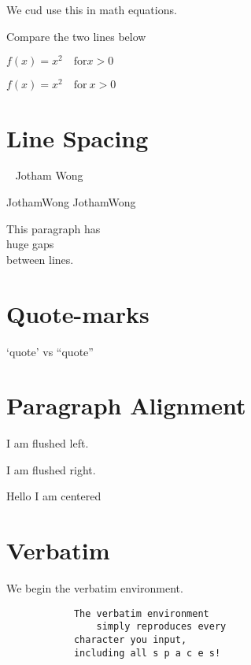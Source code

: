\documentclass[12pt]{article}
\begin{document}
    We cud use this in math equations.

    Compare the two lines below
    
    
    $f(x) = x^2 \quad \text{for} x > 0$

    $f(x) = x^2 \quad \text{for}~x > 0$

    \section{Line Spacing}

        ~ Jotham Wong   

        Jotham\singlespacing Wong
        Jotham\onehalfspace Wong

        \begin{spacing}{2.5}
            This paragraph has \\ huge gaps \\ between lines.
        \end{spacing}

    \section{Quote-marks}
    `quote' vs ``quote''

    \section{Paragraph Alignment}

        \begin{flushleft}
            I am flushed left.    
        \end{flushleft}


        \begin{flushright}
            I am flushed right.    
        \end{flushright}

        \begin{center}
            Hello I am centered
        \end{center}


    \section{Verbatim}
        
        We begin the verbatim environment.

        \begin{verbatim}
            The verbatim environment
                simply reproduces every
            character you input,
            including all s p a c e s!
        \end{verbatim}
\end{document}
